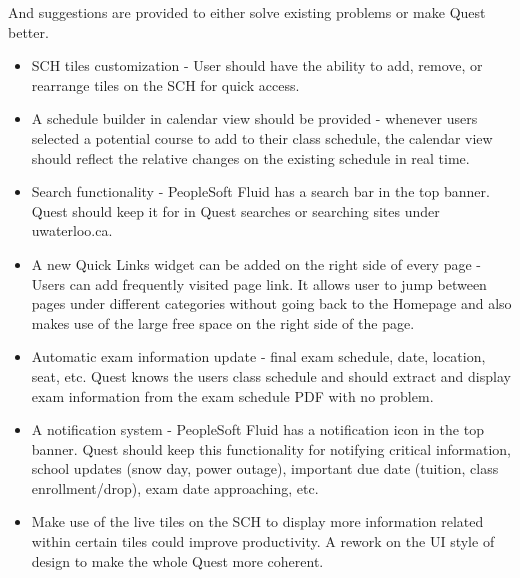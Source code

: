 \documentclass[conference]{IEEEtran}
\begin{document}
\newline
And suggestions are provided to either solve existing problems or make Quest better.
\begin{itemize}
\item SCH tiles customization - User should have the ability to add, remove, or rearrange tiles on the SCH for quick access.
\item A schedule builder in calendar view should be provided - whenever users selected a potential course to add to their class schedule, the calendar view should reflect the relative changes on the existing schedule in real time.
\item Search functionality - PeopleSoft Fluid has a search bar in the top banner. Quest should keep it for in Quest searches or searching sites under uwaterloo.ca.
\item A new Quick Links widget can be added on the right side of every page - Users can add frequently visited page link. It allows user to jump between pages under different categories without going back to the Homepage and also makes use of the large free space on the right side of the page.
\item Automatic exam information update - final exam schedule, date, location, seat, etc. Quest knows the users class schedule and should extract and display exam information from the exam schedule PDF with no problem.
\item A notification system - PeopleSoft Fluid has a notification icon in the top banner. Quest should keep this functionality for notifying critical information, school updates (snow day, power outage), important due date (tuition, class enrollment/drop), exam date approaching, etc.
\item Make use of the live tiles on the SCH to display more information related within certain tiles could improve productivity.
A rework on the UI style of design to make the whole Quest more coherent.
\end{itemize}
\end{document}
